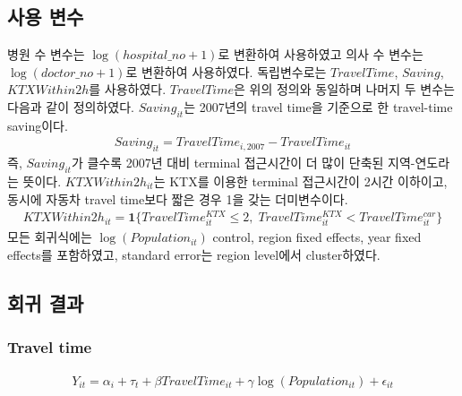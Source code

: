 \documentclass[a4paper, 10pt]{article}
\begin{document}
    \subsection{사용 변수}
        병원 수 변수는
        $\log(hospital\_no+1)$로 변환하여 사용하였고 
        의사 수 변수는 $\log(doctor\_no+1)$로 변환하여 사용하였다.
        독립변수로는 $TravelTime$, $Saving$, $KTXWithin2h$를 사용하였다.
        $TravelTime$은 위의 정의와 동일하며 나머지 두 변수는
        다음과 같이 정의하였다.
        $Saving_{it}$는 2007년의 travel time을 기준으로 한 travel-time saving이다.
        \begin{align*}
            Saving_{it} = TravelTime_{i,2007} - TravelTime_{it}
        \end{align*}
        즉, $Saving_{it}$가 클수록 2007년 대비 terminal 접근시간이 더 많이 단축된
        지역-연도라는 뜻이다.
        $KTXWithin2h_{it}$는 KTX를 이용한 terminal 접근시간이
        2시간 이하이고, 동시에 자동차 travel time보다 짧은 경우 1을 갖는 더미변수이다.
        \begin{align*}
            KTXWithin2h_{it}
            =
            \mathbf{1}\{TravelTime^{KTX}_{it} \leq 2,\;
            TravelTime^{KTX}_{it} < TravelTime^{car}_{it}\}
        \end{align*}
        모든 회귀식에는 $\log(Population_{it})$ control, region fixed effects,
        year fixed effects를 포함하였고, standard error는 region level에서 cluster하였다.
        
    \subsection{회귀 결과}
        \subsubsection{Travel time}
        \begin{align*}
            Y_{it}
            =
            \alpha_i + \tau_t + \beta TravelTime_{it}
            + \gamma \log(Population_{it}) + \epsilon_{it}
        \end{align*}

        \begin{table}[H]
            \centering
            \caption{Travel Time: 의원}
            
        \end{table}

        \begin{table}[H]
            \centering
            \caption{Travel Time: 병원}
            
        \end{table}
\end{document}

